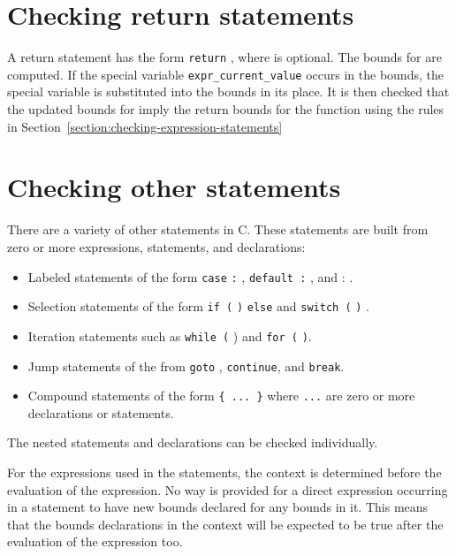  \section{Checking return statements}\label{checking-return-statements}

A return statement has the form \texttt{return} , where 
is optional. The bounds for  are computed. If the special
variable \texttt{expr\_current\_value} occurs in the bounds, the special
variable  is substituted into the bounds in its
place. It is then checked that the updated bounds for  imply the
return bounds for the function using the rules in 
Section~\ref{section:checking-expression-statements}

\section{Checking other statements}\label{checking-other-statements}

There are a variety of other statements in C. These statements are built
from zero or more expressions, statements, and declarations:

\begin{itemize}
\item
  Labeled statements of the form \texttt{case}
   \texttt{:} ,
  \texttt{default :} , and  :
  .
\item
  Selection statements of the form \texttt{if (}
  \texttt{)}  \texttt{else}
   and \texttt{switch (}  \texttt{)}
  .
\item
  Iteration statements such as \texttt{while (}  )
   and \texttt{for
  (}
  \texttt{)}.
\item
  Jump statements of the from \texttt{goto} ,
  \texttt{continue}, and \texttt{break}.
\item
  Compound statements of the form \texttt{\{ ... \}} where \texttt{...}
  are zero or more declarations or statements.
\end{itemize}

The nested statements and declarations can be checked individually.

For the expressions used in the statements, the context is determined
before the evaluation of the expression. No way is provided for a direct
expression occurring in a statement to have new bounds declared for any
bounds in it. This means that the bounds declarations in the context
will be expected to be true after the evaluation of the expression too.

